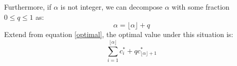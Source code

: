 \documentclass[10pt,a4paper]{article}
\begin{document}
Furthermore, if $\alpha$ is not integer, we can decompose $\alpha$ with some fraction $0 \leq q \leq 1$ as:
\begin{equation*}
	\alpha = \lfloor \alpha \rfloor + q
\end{equation*}
Extend from equation \ref{optimal}, the optimal value under this situation is: 
\begin{equation}
	\displaystyle\sum_{i = 1}^{\lfloor \alpha \rfloor}c^{*}_{i} + q c^{*}_{\lfloor \alpha \rfloor + 1}
\end{equation}
\end{document}
